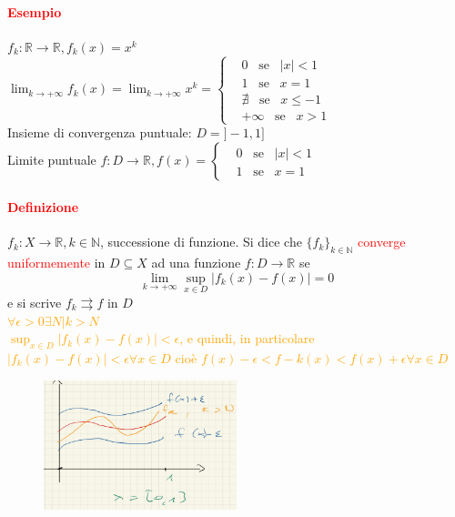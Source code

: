 \documentclass{article}
\newcommand{\R}{\mathbb{R}}
\newcommand{\N}{\mathbb{N}}
\begin{document}
\paragraph{\textcolor{red}{Esempio}}
$f_k:\R \rightarrow \R, f_k(x)=x^k$\\
$\lim_{k\rightarrow +\infty} f_k(x)=\lim_{k\rightarrow +\infty} x^k =\begin{cases}
    & 0\,\,\,\,\, \text{se} \,\,\,\,\, |x|<1 \\
    & 1 \,\,\,\,\, \text{se}\,\,\,\,\, x=1 \\
    & \nexists  \,\,\,\,\, \text{se}\,\,\,\,\, x \leq -1\\
    & +\infty  \,\,\,\,\, \text{se}\,\,\,\,\, x >1
\end{cases}$\\
Insieme di convergenza puntuale: $D=]-1,1]$\\
Limite puntuale $f:D \rightarrow \R, f(x)=\begin{cases}
    &0 \,\,\,\,\, \text{se}\,\,\,\,\, |x|<1\\
    &1  \,\,\,\,\, \text{se}\,\,\,\,\, x=1
\end{cases}$ 

\paragraph{\textcolor{red}{Definizione}}
$f_k:X \rightarrow \R, k \in \N$, successione di funzione. Si dice che $\{ f_k\}_{k\in\N}$ \textcolor{red}{converge uniformemente} in $D \subseteq X$ ad una funzione $f: D\rightarrow \R$ se 
\begin{equation*}
    \lim_{k\rightarrow+\infty}\sup_{x\in D}|f_k(x)-f(x)|=0
\end{equation*}
e si scrive $f_k \rightrightarrows f$ in $D$\\
\textcolor{orange}{$\forall \epsilon >0 \exists N | k >N$\\ 
$\sup_{x\in D}|f_k(x)-f(x)| <\epsilon$, e quindi, in particolare $|f_k(x)-f(x)|<\epsilon \forall x \in D$ cioè $f(x)-\epsilon <f-k(x)<f(x)+\epsilon \forall x \in D$}\\
\begin{figure}[!h]
    \centering
    \includegraphics[width=0.5\textwidth]{Screenshot from 2023-03-28 22-27-28.png}
\end{figure}
\end{document}
